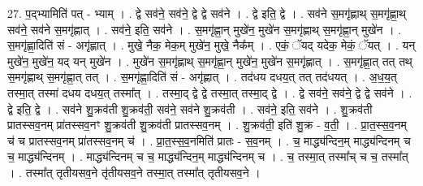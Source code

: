 \documentclass[17pt]{extarticle}
\begin{document}
27. प॒द्भ्यामिति॑ पत् - भ्याम् । . द्वे सव॑ने॒ सव॑ने॒ द्वे द्वे सव॑ने । . द्वे इति॒ द्वे । . सव॑ने स॒मगृ॑ह्णाथ् स॒मगृ॑ह्णा॒थ् सव॑ने॒ सव॑ने स॒मगृ॑ह्णात् । . सव॑ने॒ इति॒ सव॑ने । . स॒मगृ॑ह्णा॒न् मुखे॑न॒ मुखे॑न स॒मगृ॑ह्णाथ् स॒मगृ॑ह्णा॒न् मुखे॑न । . स॒मगृ॑ह्णा॒दिति॑ सं - अगृ॑ह्णात् । . मुखे॒ नैक॒ मेक॒म् मुखे॑न॒ मुखे॒ नैक᳚म् । . एकं॒ ॅयद् यदेक॒ मेकं॒ ॅयत् । . यन् मुखे॑न॒ मुखे॑न॒ यद् यन् मुखे॑न । . मुखे॑न स॒मगृ॑ह्णाथ् स॒मगृ॑ह्णा॒न् मुखे॑न॒ मुखे॑न स॒मगृ॑ह्णात् । . स॒मगृ॑ह्णा॒त् तत् तथ् स॒मगृ॑ह्णाथ् स॒मगृ॑ह्णा॒त् तत् । . स॒मगृ॑ह्णा॒दिति॑ सं - अगृ॑ह्णात् । . तद॑धय दधय॒त् तत् तद॑धयत् । . अ॒ध॒य॒त् तस्मा॒त् तस्मा॑ दधय दधय॒त् तस्मा᳚त् । . तस्मा॒द् द्वे द्वे तस्मा॒त् तस्मा॒द् द्वे । . द्वे सव॑ने॒ सव॑ने॒ द्वे द्वे सव॑ने । . द्वे इति॒ द्वे । . सव॑ने शु॒क्रव॑ती शु॒क्रव॑ती॒ सव॑ने॒ सव॑ने शु॒क्रव॑ती । . सव॑ने॒ इति॒ सव॑ने । . शु॒क्रव॑ती प्रातस्सव॒नम् प्रा॑तस्सव॒नꣳ शु॒क्रव॑ती शु॒क्रव॑ती प्रातस्सव॒नम् । . शु॒क्रव॑ती॒ इति॑ शु॒क्र - व॒ती॒ । . प्रा॒त॒स्स॒व॒नम् च॑ च प्रातस्सव॒नम् प्रा॑तस्सव॒नम् च॑ । . प्रा॒त॒स्स॒व॒नमिति॑ प्रातः - स॒व॒नम् । . च॒ माद्ध्य॑न्दिन॒म् माद्ध्य॑न्दिनम् च च॒ माद्ध्य॑न्दिनम् । . माद्ध्य॑न्दिनम् च च॒ माद्ध्य॑न्दिन॒म् माद्ध्य॑न्दिनम् च । . च॒ तस्मा॒त् तस्मा᳚च् च च॒ तस्मा᳚त् । . तस्मा᳚त् तृतीयसव॒ने तृ॑तीयसव॒ने तस्मा॒त् तस्मा᳚त् तृतीयसव॒ने । \newline
\end{document}
